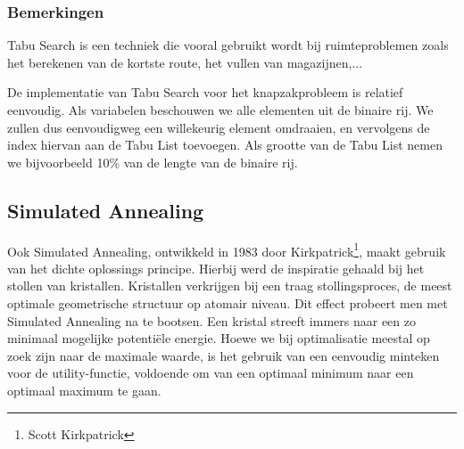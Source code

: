 \subsubsection{Bemerkingen} Tabu Search is een techniek die vooral gebruikt wordt bij ruimteproblemen zoals het berekenen van de kortste route, het vullen van magazijnen,...
\begin{leftbar}
De implementatie van Tabu Search voor het knapzakprobleem is relatief eenvoudig. Als variabelen beschouwen we alle elementen uit de binaire rij. We zullen dus eenvoudigweg een willekeurig element omdraaien, en vervolgens de index hiervan aan de Tabu List toevoegen. Als grootte van de Tabu List nemen we bijvoorbeeld 10\% van de lengte van de binaire rij.
\end{leftbar}
\subsection{Simulated Annealing}
\label{ss:simulatedAnnealing}
Ook Simulated Annealing, ontwikkeld in 1983 door Kirkpatrick\footnote{Scott Kirkpatrick}, maakt gebruik van het dichte oplossings principe. Hierbij werd de inspiratie gehaald bij het stollen van kristallen. Kristallen verkrijgen bij een traag stollingsproces, de meest optimale geometrische structuur op atomair niveau. Dit effect probeert men met Simulated Annealing na te bootsen. Een kristal streeft immers naar een zo minimaal mogelijke potenti\"ele energie. Hoewe we bij optimalisatie meestal op zoek zijn naar de maximale waarde, is het gebruik van een eenvoudig minteken voor de utility-functie, voldoende om van een optimaal minimum naar een optimaal maximum te gaan.

